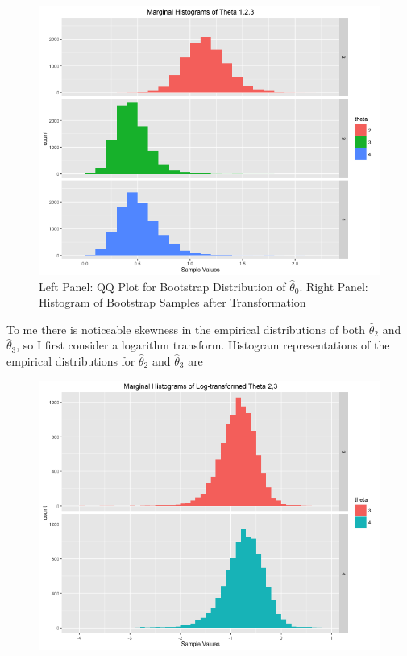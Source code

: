 \documentclass[11pt]{article}
\begin{document}
\begin{enumerate}
\begin{enumerate}
\begin{figure}[H]
				\includegraphics[scale=0.4]{Rplot02}
				\caption{Left Panel: QQ Plot for Bootstrap Distribution of $\widehat{\theta}_0$. Right Panel: Histogram of Bootstrap Samples after Transformation}
			\end{figure}
			To me there is noticeable skewness in the empirical distributions of both $\widehat{\theta}_2$ and $\widehat{\theta}_3$, so I first consider a logarithm transform. Histogram representations of the empirical distributions for $\widehat{\theta}_2$ and $\widehat{\theta}_3$ are 
			\begin{figure}[H]
			\centering			
			\includegraphics[scale=0.5]{Rplot03}
			\end{figure}

\end{enumerate}
\end{enumerate}
\end{document}

